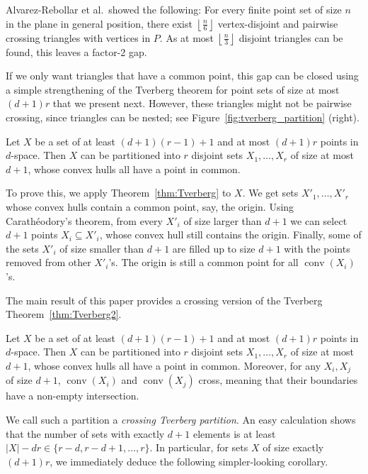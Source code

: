 \documentclass[english,a4paper,nolineno]{lipics-v2019}
\newcommand{\conv}{\mathop{\mathrm{conv}}}
\begin{document}
Alvarez-Rebollar et al.\ showed the following: For every finite point set of size $n$ in the plane in general position, there exist $\left\lfloor\frac{n}{6}\right\rfloor$ vertex-disjoint and pairwise crossing triangles with vertices in $P$. As at most $\left\lfloor\frac{n}{3}\right\rfloor$ disjoint triangles can be found, this leaves a factor-2 gap.

If we only want triangles that have a common point, this gap can be closed using a simple strengthening of the Tverberg theorem for point sets of size at most $(d+1)r$ that we present next. However, these triangles might not be pairwise crossing, since triangles can be nested; see Figure~\ref{fig:tverberg_partition} (right).

\begin{theorem}\label{thm:Tverberg2}
Let $X$ be a set of at least $(d+1)(r-1)+1$ and at most $(d+1)r$ points in $d$-space. Then $X$ can be partitioned into $r$ disjoint sets $X_1,\ldots, X_r$ of size at most $d+1$, whose convex hulls all have a point in common. 
\end{theorem}

To prove this, we apply Theorem~\ref{thm:Tverberg} to $X$. We get sets $X'_1,\ldots, X'_r$ whose convex hulls contain a common point, say, the origin. Using Carath\' eodory's theorem, from every $X'_i$ of size larger than $d+1$ we can select $d+1$ points $X_i\subseteq X'_i$, whose convex hull still contains the origin. Finally, some of the sets $X'_i$ of size smaller than $d+1$ are filled up to size $d+1$ with the points removed from other $X'_i$'s.  The origin is still a common point for all $\conv(X_i)$'s.

The main result of this paper provides a crossing version of the Tverberg Theorem~\ref{thm:Tverberg2}.

\begin{theorem} \label{thm:main} Let $X$ be a set of at least $(d+1)(r-1)+1$ and at most $(d+1)r$ points in $d$-space. Then $X$ can be partitioned into $r$ disjoint sets $X_1,\ldots, X_r$ of size at most $d+1$, whose convex hulls all have a point in common. Moreover, for any $X_i,X_j$ of size $d+1$, $\conv (X_i)$ and $\conv (X_j)$ cross, meaning that their boundaries have a non-empty intersection.
\end{theorem} 

We call such a partition a \emph{crossing Tverberg partition}. An easy calculation shows that the number of sets with exactly $d+1$ elements is at least $|X|-dr\in\{r-d,r-d+1,\ldots,r\}$. In particular, for sets $X$ of size exactly $(d+1)r$, we immediately deduce the following simpler-looking corollary.
\end{document}
